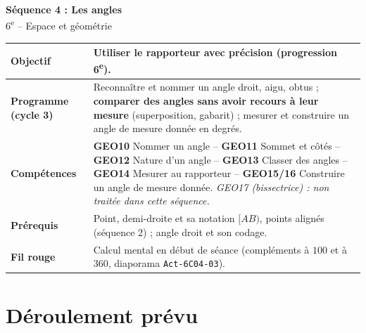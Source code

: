 \documentclass[11pt]{article}
\newcommand{\champ}[2]{\textbf{#1} & #2 \\ \hline}
\newcommand{\doc}[1]{\texttt{\small #1}}
\begin{document}
\begin{center}
{\Large\bfseries Séquence 4 : Les angles}\\[1mm]
{\large 6\textsuperscript{e} -- Espace et géométrie}
\end{center}

\renewcommand{\arraystretch}{1.35}
\begin{tabularx}{\linewidth}{|>{\raggedright\arraybackslash}p{3.4cm}|X|}
\hline
\champ{Objectif}{Utiliser le rapporteur avec précision (progression 6\textsuperscript{e}).}
\champ{Programme (cycle 3)}{Reconnaître et nommer un angle droit, aigu, obtus ; \textbf{comparer des angles sans avoir recours à leur mesure} (superposition, gabarit) ; mesurer et construire un angle de mesure donnée en degrés.}
\champ{Compétences}{\textbf{GEO10} Nommer un angle -- \textbf{GEO11} Sommet et côtés -- \textbf{GEO12} Nature d'un angle -- \textbf{GEO13} Classer des angles -- \textbf{GEO14} Mesurer au rapporteur -- \textbf{GEO15/16} Construire un angle de mesure donnée. \newline
\textit{GEO17 (bissectrice) : non traitée dans cette séquence.}}
\champ{Prérequis}{Point, demi-droite et sa notation $[AB)$, points alignés (séquence 2) ; angle droit et son codage.}
\champ{Fil rouge}{Calcul mental en début de séance (compléments à $100$ et à $360$, diaporama \doc{Act-6C04-03}).}
\end{tabularx}

\section*{Déroulement prévu}
\end{document}
